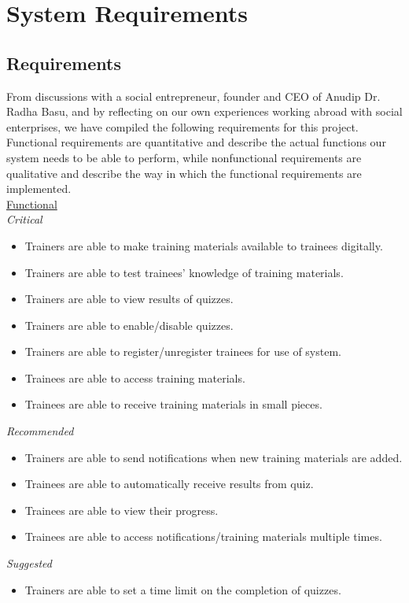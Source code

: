\chapter{System Requirements}


\section{Requirements}
From discussions with a social entrepreneur, founder and CEO of Anudip Dr. Radha Basu, and by reflecting on our own experiences working abroad with social enterprises, we have compiled the following requirements for this project. Functional requirements are quantitative and describe the actual functions our system needs to be able to perform, while nonfunctional requirements are qualitative and describe the way in which the functional requirements are implemented. \\[-0.7\baselineskip]

\underline{Functional}\\
\textit{Critical}
\begin{itemize}
\item Trainers are able to make training materials available to trainees digitally.
\item Trainers are able to test trainees’ knowledge of training materials.
\item Trainers are able to view results of quizzes.
\item Trainers are able to enable/disable quizzes.
\item Trainers are able to register/unregister trainees for use of system.
\item Trainees are able to access training materials.
\item Trainees are able to receive training materials in small pieces.
\end{itemize}

\textit{Recommended}
\begin{itemize}
\item Trainers are able to send notifications when new training materials are added.
\item Trainees are able to automatically receive results from quiz.
\item Trainees are able to view their progress.
\item Trainees are able to access notifications/training materials multiple times.
\end{itemize}

\textit{Suggested}
\begin{itemize}
\item Trainers are able to set a time limit on the completion of quizzes.\\[-0.5\baselineskip]
\end{itemize}

